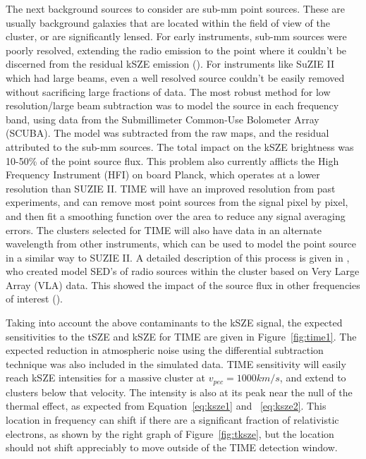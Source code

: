 \documentclass[manuscript]{aastex}
\begin{document}
The next background sources to consider are sub-mm point sources. These are usually background galaxies that are located within the field of view of the cluster, or are significantly lensed. For early instruments, sub-mm sources were poorly resolved, extending the radio emission to the point where it couldn't be discerned from the residual kSZE emission (\cite{Benson2003}). For instruments like SuZIE II which had large beams, even a well resolved source couldn't be easily removed without sacrificing large fractions of data. The most robust method for low resolution/large beam subtraction was to model the source in each frequency band, using data from the Submillimeter Common-Use Bolometer Array (SCUBA). The model was subtracted from the raw maps, and the residual attributed to the sub-mm sources. The total impact on the kSZE brightness was 10-50\% of the point source flux. This problem also currently afflicts the High Frequency Instrument (HFI) on board Planck, which operates at a lower resolution than SUZIE II. TIME will have an improved resolution from past experiments, and can remove most point sources from the signal pixel by pixel, and then fit a smoothing function over the area to reduce any signal averaging errors. The clusters selected for TIME will also have data in an alternate wavelength from other instruments, which can be used to model the point source in a similar way to SUZIE II. A detailed description of this process is given in \cite{Adam2016}, who created model SED's of radio sources within the cluster based on Very Large Array (VLA) data. This showed the impact of the source flux in other frequencies of interest (\cite{Adam2017}). 


Taking into account the above contaminants to the kSZE signal, the expected sensitivities to the tSZE and kSZE for TIME are given in Figure~\ref{fig:time1}. The expected reduction in atmospheric noise using the differential subtraction technique was also included in the simulated data. TIME sensitivity will easily reach kSZE intensities for a massive cluster at $v_{pec} = 1000 km/s$, and extend to clusters below that velocity. The intensity is also at its peak near the null of the thermal effect, as expected from Equation~\ref{eq:ksze1} and ~\ref{eq:ksze2}. This location in frequency can shift if there are a significant fraction of relativistic electrons, as shown by the right graph of Figure~\ref{fig:tksze}, but the location should not shift appreciably to move outside of the TIME detection window.
\end{document}
